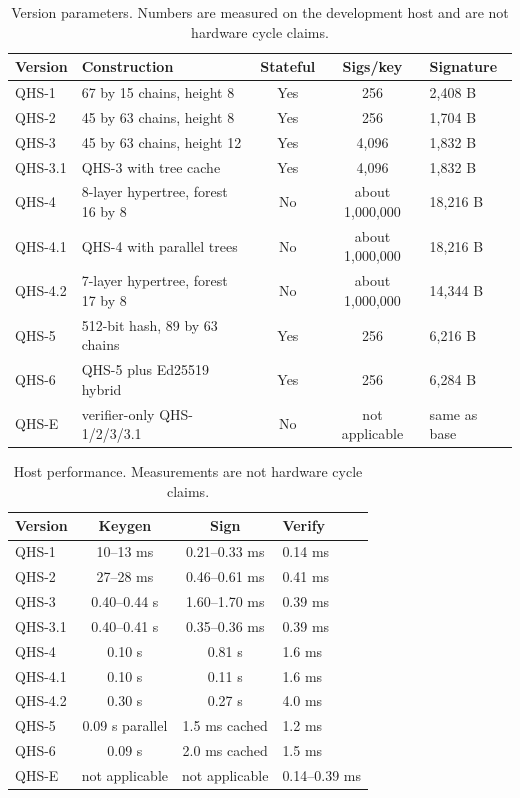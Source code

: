 \documentclass[11pt,a4paper]{article}
\begin{document}
\begin{table}[ht]
\centering
\caption{Version parameters. Numbers are measured on the development host and
are not hardware cycle claims.}
\label{tab:versions}
\footnotesize
\begin{tabularx}{\textwidth}{@{}p{1.35cm}p{4.6cm}c c Y@{}}
\toprule
Version & Construction & Stateful & Sigs/key & Signature\\
\midrule
QHS-1 & 67 by 15 chains, height 8 & Yes & 256 & 2,408 B\\
QHS-2 & 45 by 63 chains, height 8 & Yes & 256 & 1,704 B\\
QHS-3 & 45 by 63 chains, height 12 & Yes & 4,096 & 1,832 B\\
QHS-3.1 & QHS-3 with tree cache & Yes & 4,096 & 1,832 B\\
QHS-4 & 8-layer hypertree, forest 16 by 8 & No & about 1,000,000 & 18,216 B\\
QHS-4.1 & QHS-4 with parallel trees & No & about 1,000,000 & 18,216 B\\
QHS-4.2 & 7-layer hypertree, forest 17 by 8 & No & about 1,000,000 & 14,344 B\\
QHS-5 & 512-bit hash, 89 by 63 chains & Yes & 256 & 6,216 B\\
QHS-6 & QHS-5 plus Ed25519 hybrid & Yes & 256 & 6,284 B\\
QHS-E & verifier-only QHS-1/2/3/3.1 & No & not applicable & same as base\\
\bottomrule
\end{tabularx}
\end{table}
\FloatBarrier

\begin{table}[ht]
\centering
\caption{Host performance. Measurements are not hardware cycle claims.}
\label{tab:performance}
\footnotesize
\begin{tabularx}{\textwidth}{@{}l c c Y@{}}
\toprule
Version & Keygen & Sign & Verify\\
\midrule
QHS-1 & 10--13 ms & 0.21--0.33 ms & 0.14 ms\\
QHS-2 & 27--28 ms & 0.46--0.61 ms & 0.41 ms\\
QHS-3 & 0.40--0.44 s & 1.60--1.70 ms & 0.39 ms\\
QHS-3.1 & 0.40--0.41 s & 0.35--0.36 ms & 0.39 ms\\
QHS-4 & 0.10 s & 0.81 s & 1.6 ms\\
QHS-4.1 & 0.10 s & 0.11 s & 1.6 ms\\
QHS-4.2 & 0.30 s & 0.27 s & 4.0 ms\\
QHS-5 & 0.09 s parallel & 1.5 ms cached & 1.2 ms\\
QHS-6 & 0.09 s & 2.0 ms cached & 1.5 ms\\
QHS-E & not applicable & not applicable & 0.14--0.39 ms\\
\bottomrule
\end{tabularx}
\end{table}
\FloatBarrier
\end{document}
